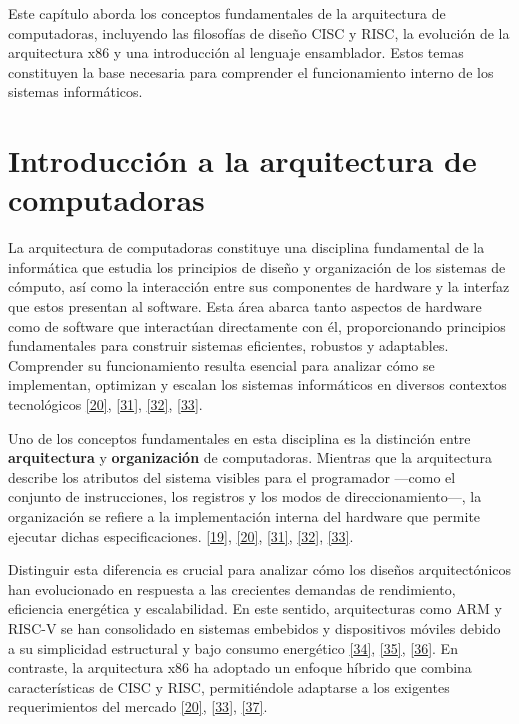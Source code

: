 \documentclass[12pt,oneside]{templates/unerthesis}
\begin{document}
Este capítulo aborda los conceptos fundamentales de la arquitectura de computadoras, incluyendo las filosofías de diseño CISC y RISC, la evolución de la arquitectura x86 y una introducción al lenguaje ensamblador. Estos temas constituyen la base necesaria para comprender el funcionamiento interno de los sistemas informáticos.

\hypertarget{introducciuxf3n-a-la-arquitectura-de-computadoras}{%
\section{Introducción a la arquitectura de computadoras}\label{introducciuxf3n-a-la-arquitectura-de-computadoras}}

La arquitectura de computadoras constituye una disciplina fundamental de la informática que estudia los principios de diseño y organización de los sistemas de cómputo, así como la interacción entre sus componentes de hardware y la interfaz que estos presentan al software. Esta área abarca tanto aspectos de hardware como de software que interactúan directamente con él, proporcionando principios fundamentales para construir sistemas eficientes, robustos y adaptables. Comprender su funcionamiento resulta esencial para analizar cómo se implementan, optimizan y escalan los sistemas informáticos en diversos contextos tecnológicos \protect\hyperlink{ref-stallings_computer_2021}{{[}20{]}}, \protect\hyperlink{ref-tanenbaum_structured_2016}{{[}31{]}}, \protect\hyperlink{ref-murdocca_principles_2000}{{[}32{]}}, \protect\hyperlink{ref-bryant2015computer}{{[}33{]}}.

Uno de los conceptos fundamentales en esta disciplina es la distinción entre \textbf{arquitectura} y \textbf{organización} de computadoras. Mientras que la arquitectura describe los atributos del sistema visibles para el programador ---como el conjunto de instrucciones, los registros y los modos de direccionamiento---, la organización se refiere a la implementación interna del hardware que permite ejecutar dichas especificaciones. \protect\hyperlink{ref-hennessy2017computer}{{[}19{]}}, \protect\hyperlink{ref-stallings_computer_2021}{{[}20{]}}, \protect\hyperlink{ref-tanenbaum_structured_2016}{{[}31{]}}, \protect\hyperlink{ref-murdocca_principles_2000}{{[}32{]}}, \protect\hyperlink{ref-bryant2015computer}{{[}33{]}}.

Distinguir esta diferencia es crucial para analizar cómo los diseños arquitectónicos han evolucionado en respuesta a las crecientes demandas de rendimiento, eficiencia energética y escalabilidad. En este sentido, arquitecturas como ARM y RISC-V se han consolidado en sistemas embebidos y dispositivos móviles debido a su simplicidad estructural y bajo consumo energético \protect\hyperlink{ref-waterman_risc-v_2014}{{[}34{]}}, \protect\hyperlink{ref-harris2015digital}{{[}35{]}}, \protect\hyperlink{ref-null_essentials_2023}{{[}36{]}}. En contraste, la arquitectura x86 ha adoptado un enfoque híbrido que combina características de CISC y RISC, permitiéndole adaptarse a los exigentes requerimientos del mercado \protect\hyperlink{ref-stallings_computer_2021}{{[}20{]}}, \protect\hyperlink{ref-bryant2015computer}{{[}33{]}}, \protect\hyperlink{ref-patterson_computer_2014}{{[}37{]}}.
\end{document}
